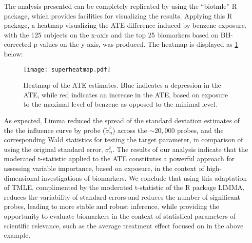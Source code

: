 The analysis presented can be completely replicated by using the ``biotmle'' R
package, which provides facilities for visualizing the results. Applying this
R package, a heatmap visualizing the ATE difference induced by benzene exposure,
with the 125 subjects on the x-axis and the top 25 biomarkers based on
BH-corrected p-values on the y-axis, was produced. The heatmap is displayed as
\ref{fig:heatmap} below:

\begin{figure}[H]
  \vspace{-8em}
  \label{fig:heatmap}
  \centering
  \texttt{[image: superheatmap.pdf]}
  \caption{Heatmap of the ATE estimates. Blue indicates a depression in the
    ATE, while red indicates an increase in the ATE, based on exposure to the
    maximal level of benzene as opposed to the minimal level.}
\end{figure}

As expected, Limma reduced the spread of the standard deviation estimates of
the the influence curve by probe ($\widetilde{\sigma}^b_n$) across the
$\sim 20,000$ probes, and the corresponding Wald statistics for testing the
target parameter, in comparison of using the original standard error,
$\sigma^b_n$. The results of our analysis indicate that the moderated
t-statistic applied to the ATE constitutes a powerful approach for assessing
variable importance, based on exposure, in the context of high-dimensional
investigations of biomarkers. We conclude that using this adaptation of TMLE,
complimented by the moderated t-statistic of the R package LIMMA, reduces the
variability of standard errors and reduces the number of significant probes,
leading to more stable and robust inference, while providing the opportunity to
evaluate biomarkers in the context of statistical parameters of scientific
relevance, such as the average treatment effect focused on in the above example.

